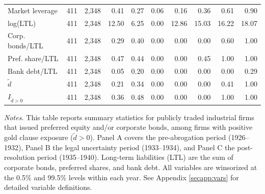 \begin{table}[p]
\begin{threeparttable}
\begin{tabular}{lrrrrrrrrr}
            Market leverage & 411 & 2,348 & 0.41 & 0.27 & 0.06 & 0.16 & 0.36 & 0.61 & 0.90 \\
            log(LTL) & 411 & 2,348 & 12.50 & 6.25 & 0.00 & 12.86 & 15.03 & 16.22 & 18.07 \\
            Corp. bonds/LTL & 411 & 2,348 & 0.29 & 0.40 & 0.00 & 0.00 & 0.00 & 0.60 & 1.00 \\
            Pref. share/LTL & 411 & 2,348 & 0.47 & 0.44 & 0.00 & 0.00 & 0.45 & 1.00 & 1.00 \\
            Bank debt/LTL & 411 & 2,348 & 0.05 & 0.20 & 0.00 & 0.00 & 0.00 & 0.00 & 0.29 \\
            \ensuremath{\tilde{d}} & 411 & 2,348 & 0.21 & 0.34 & 0.00 & 0.00 & 0.00 & 0.41 & 1.00 \\
            \ensuremath{I_{\tilde{d}>0}} & 411 & 2,348 & 0.36 & 0.48 & 0.00 & 0.00 & 0.00 & 1.00 & 1.00 \\
            \bottomrule
        \end{tabular}
    \end{threeparttable}

    \vspace*{3mm} \justifying \noindent
\scriptsize{\textit{Notes.} This table reports summary statistics for publicly traded industrial firms that issued preferred equity and/or corporate bonds, among firms with positive gold clause exposure ($\tilde{d} > 0$). Panel A covers the pre-abrogation period (1926--1932), Panel B the legal uncertainty period (1933--1934), and Panel C the post-resolution period (1935--1940). Long-term liabilities (LTL) are the sum of corporate bonds, preferred shares, and bank debt. All variables are winsorized at the 0.5\% and 99.5\% levels within each year. See Appendix \ref{secapp:vars} for detailed variable definitions.}
\end{table}